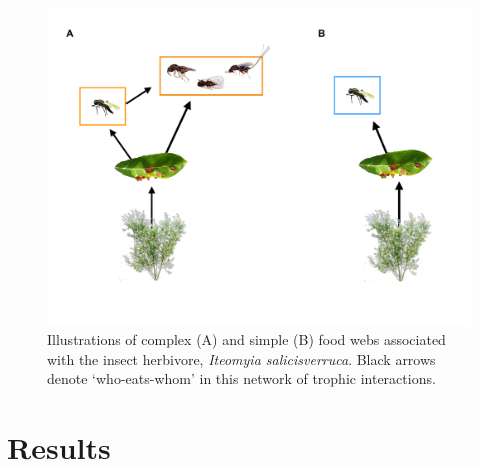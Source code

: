 \documentclass[]{elsarticle} %
\makeatletter
\def\maxwidth{\ifdim\Gin@nat@width>\linewidth\linewidth
\else\Gin@nat@width\fi}
\let\Oldincludegraphics\includegraphics
\renewcommand{\includegraphics}[1]{\Oldincludegraphics[width=\maxwidth]{#1}}
\makeatother
\begin{document}
\begin{figure}
\centering
\includegraphics{complex_simple_foodwebs_compressed.pdf}
\caption{Illustrations of complex (A) and simple (B) food webs
associated with the insect herbivore, \emph{Iteomyia salicisverruca}.
Black arrows denote `who-eats-whom' in this network of trophic
interactions.}
\end{figure}

\section{Results}\label{results}
\end{document}
